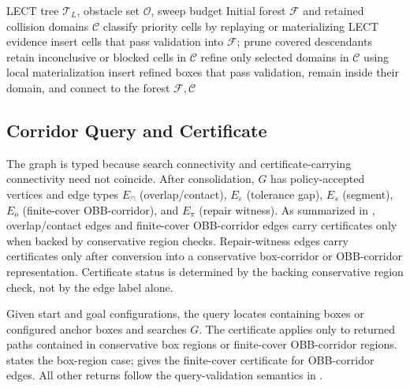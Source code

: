 \documentclass[journal]{IEEEtran}
\newcommand{\calO}{\ensuremath{\mathcal{O}}}
\begin{document}
\begin{algorithm}[t]
\caption{Adaptive leaf sweep (selected leaf-cell pass) and local refinement.}
\label{alg:leaf_sweep_refine}
\footnotesize
\begin{algorithmic}[1]
\REQUIRE LECT tree $\mathcal{T}_L$, obstacle set $\calO$, sweep budget
\ENSURE Initial forest $\mathcal{F}$ and retained collision domains $\mathcal{C}$
\STATE classify priority cells by replaying or materializing LECT evidence
\STATE insert cells that pass validation into $\mathcal{F}$; prune covered descendants
\STATE retain inconclusive or blocked cells in $\mathcal{C}$
\STATE refine only selected domains in $\mathcal{C}$ using local materialization
\STATE insert refined boxes that pass validation, remain inside their domain, and
connect to the forest
\RETURN $\mathcal{F},\mathcal{C}$
\end{algorithmic}
\end{algorithm}

\FloatBarrier
{}
\subsection{Corridor Query and Certificate}
\label{sec:forest_graph}

\begin{samepage}
The graph is typed because search connectivity and certificate-carrying
connectivity need not coincide. After consolidation, $G$ has policy-accepted
vertices and edge types
$E_{\cap}$ (overlap/contact), $E_{\varepsilon}$ (tolerance gap), $E_s$
(segment), $E_o$ (finite-cover OBB-corridor), and $E_{\pi}$ (repair witness).
As summarized in , overlap/contact edges and
finite-cover OBB-corridor edges carry certificates only when backed by
conservative region checks. Repair-witness edges carry certificates only after
conversion into a conservative box-corridor or OBB-corridor representation.
Certificate status is determined by the backing conservative region check, not
by the edge label alone.
\end{samepage}

\begin{samepage}
Given start and goal configurations, the query locates containing boxes or
configured anchor boxes and searches $G$. The certificate applies only to
returned paths contained in conservative box regions or finite-cover
OBB-corridor regions.  states the box-region
case;  gives the finite-cover certificate for
OBB-corridor edges. All other returns follow the query-validation semantics in
.
\end{samepage}
\end{document}
